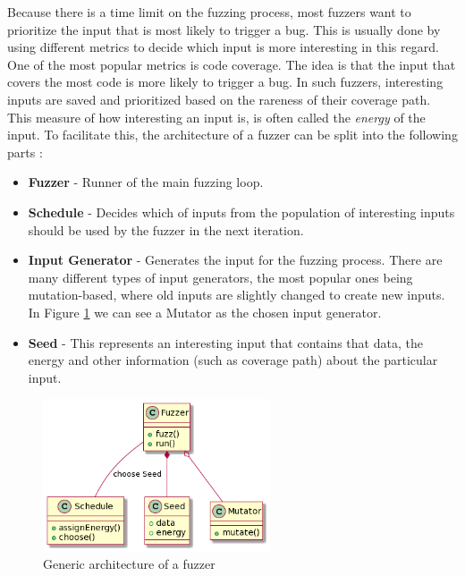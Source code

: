 Because there is a time limit on the fuzzing process, most fuzzers want to prioritize the input that is most likely to trigger a bug.
This is usually done by using different metrics to decide which input is more interesting in this regard.
One of the most popular metrics is code coverage.
The idea is that the input that covers the most code is more likely to trigger a bug.
In such fuzzers, interesting inputs are saved and prioritized based on the rareness of their coverage path.
This measure of how interesting an input is, is often called the \textit{energy} of the input.
To facilitate this, the architecture of a fuzzer can be split into the following parts \cite{zeller_greybox_2023}:
\begin{itemize}
    \item \textbf{Fuzzer} - Runner of the main fuzzing loop.
    \item \textbf{Schedule} - Decides which of inputs from the population of interesting inputs should be used by the fuzzer in the next iteration.
    \item \textbf{Input Generator} - Generates the input for the fuzzing process. There are many different types of input generators, the most popular ones being mutation-based, where old inputs are slightly changed to create new inputs. In Figure \ref{fig:generic-fuzzer-architecture} we can see a Mutator as the chosen input generator.
    \item \textbf{Seed} - This represents an interesting input that contains that data, the energy and other information (such as coverage path) about the particular input.
\end{itemize}

\begin{figure}[htbp]
    \centering
    \includegraphics[width=0.6\textwidth]{figures/generic-fuzzer-architecture.png}
    \caption{Generic architecture of a fuzzer}\label{fig:generic-fuzzer-architecture}
\end{figure}

